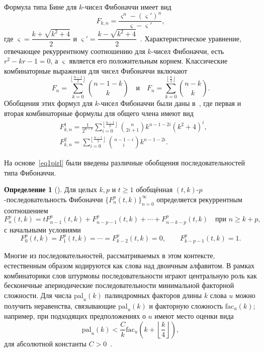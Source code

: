 \documentclass[a4paper,14pt]{extreport}
\theoremstyle{plain}
\theoremstyle{definition}
\newtheorem{definition}{Определение}[section]
\theoremstyle{remark}
\begin{document}
Формула типа Бине для $k$-чисел Фибоначчи имеет вид
\begin{equation}
	F_{k,n} = \frac{\varsigma^n - (\varsigma')^n}{\varsigma - \varsigma'},
\end{equation}
где $\varsigma = \dfrac{k + \sqrt{k^2 + 4}}{2}$ и $\varsigma' = \dfrac{k - \sqrt{k^2 + 4}}{2}$~\cite{Falcon2007Plaza,Falcon2007PlazaSeco}. Характеристическое уравнение, отвечающее рекуррентному соотношению для $k$-чисел Фибоначчи, есть $r^2 - kr - 1 = 0$, а $\varsigma$ является его положительным корнем. Классические комбинаторные выражения для чисел Фибоначчи включают
\begin{equation}
	F_n = \sum_{k=0}^{\left\lfloor \frac{n-1}{2} \right\rfloor} \binom{n-1-k}{k}
	\quad\text{и}\quad
	F_n = \sum_{k=0}^{\left\lfloor \frac{n}{2} \right\rfloor} \binom{n-k}{k}.
\end{equation}
Обобщения этих формул для $k$-чисел Фибоначчи были даны в~\cite{Falcon2007PlazaThird}, где первая и вторая комбинаторные формулы для общего члена имеют вид
\begin{align}
	&	F^{1}_{k,n}
	= \frac{1}{2^{n-1}} \sum_{i=0}^{\left\lfloor \frac{n-1}{2} \right\rfloor}
	\binom{n}{2i+1} k^{ n-1-2i} (k^2+4)^i,\label{eq1pirl}\\
	&	F^{2}_{k,n}
	= \sum_{i=0}^{\left\lfloor \frac{n-1}{2} \right\rfloor}
	\binom{n-1-i}{i} k^{ n-1-2i}.\label{eq1pirl00}
\end{align}


На основе~\eqref{eq1pirl} были введены различные обобщения последовательностей типа Фибоначчи.

\begin{definition}[\cite{Mehraban2006Gulliver}]\label{defn1pil}
	Для целых $k,p$ и $t \geq 1$ обобщённая $(t,k)$-$p$-последовательность Фибоначчи $\{F_n^p(t,k)\}_{n=0}^\infty$ определяется рекуррентным соотношением
	\begin{equation}
		F_n^p(t,k)
		= t F_{n-1}^p(t,k) + F_{n-p-1}^p(t,k) + \cdots + F_{n-k-p}^p(t,k)
		\quad\text{при } n \geq k+p,
	\end{equation}
	с начальными условиями
	\begin{equation}
		F_0^p(t,k) = F_1^p(t,k) = \cdots = F_{k-2}^p(t,k) = 0,
		\qquad
		F_{k-p-1}^p(t,k) = 1.
	\end{equation}
\end{definition}

Многие из последовательностей, рассматриваемых в этом контексте, естественным образом кодируются как слова над двоичным алфавитом. В рамках комбинаторики слов штурмовы последовательности играют центральную роль как бесконечные апериодические последовательности минимальной факторной сложности. Для числа $\mathrm{pal}_u(k)$ палиндромных факторов длины $k$ слова $u$ можно получить неравенства, связывающие $\mathrm{pal}_u(k)$ и факторную сложность $\mathrm{fac}_u(k)$; например, при подходящих предположениях о $u$ имеют место оценки вида
\begin{equation}
	\mathrm{pal}_u(k) < \frac{C}{k} \mathrm{fac}_u\!\left(k+\left\lfloor\frac{k}{4}\right\rfloor\right),
\end{equation}
для абсолютной константы $C>0$~\cite{AlloucheBaake}.
\end{document}
